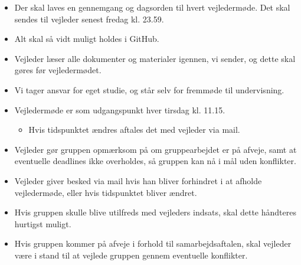 \begin{itemize}
    \item Der skal laves en gennemgang og dagsorden til hvert vejledermøde. Det skal sendes til vejleder senest fredag kl. 23.59.
    \item Alt skal så vidt muligt holdes i GitHub.
    \item Vejleder læser alle dokumenter og materialer igennen, vi sender, og dette skal gøres før vejledermødet.
    \item Vi tager ansvar for eget studie, og står selv for fremmøde til undervisning.
    \item Vejledermøde er som udgangspunkt hver tirsdag kl. 11.15.
    \begin{itemize}
        \item Hvis tidspunktet ændres aftales det med vejleder via mail.
    \end{itemize}
    \item Vejleder gør gruppen opmærksom på om gruppearbejdet er på afveje, samt at eventuelle deadlines ikke overholdes, så gruppen kan nå i mål uden konflikter.
    \item Vejleder giver besked via mail hvis han bliver forhindret i at afholde vejledermøde, eller hvis tidspunktet bliver ændret.
    \item Hvis gruppen skulle blive utilfreds med vejleders indsats, skal dette håndteres hurtigst muligt.
    \item Hvis gruppen kommer på afveje i forhold til samarbejdsaftalen, skal vejleder være i stand til at vejlede gruppen gennem eventuelle konflikter.
\end{itemize}